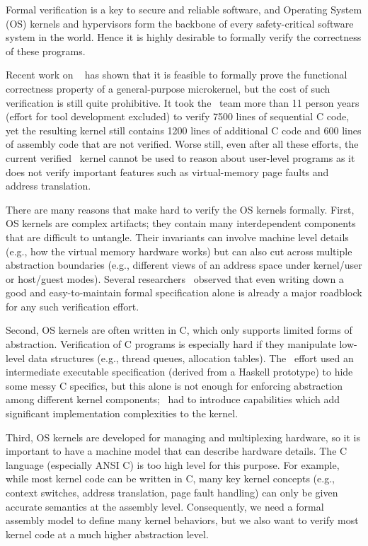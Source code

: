 
Formal verification is a key to secure and reliable software, and  Operating System (OS) kernels and hypervisors form the backbone of every safety-critical software system in the world. 
Hence it is highly desirable to formally verify the correctness of these programs.

Recent work on \selfour~\cite{klein2009sel4,klein14} has shown that it is feasible to formally prove the functional correctness property of a general-purpose microkernel, but the cost of such verification is still quite prohibitive. 
It took the \selfour\ team more than 11 person years (effort for tool development excluded) to verify 7500 lines of sequential C code, yet the resulting kernel still contains 1200 lines of additional C code and 600 lines of assembly code that are not verified. 
Worse still, even after all these efforts, the current verified \selfour\ kernel cannot be used to reason about user-level programs as it does not verify important features such as virtual-memory page faults and address translation.

There are many reasons that make hard to verify the OS kernels formally.
First, OS kernels are complex artifacts; they contain many interdependent components that are difficult to untangle.
Their invariants can involve machine level details (e.g., how the virtual memory hardware works) but can also cut across multiple abstraction boundaries (e.g., different views of an address space under kernel/user or host/guest modes).
Several researchers~\cite{baumann12,vaynberg12} observed that even writing down a good and easy-to-maintain formal specification alone is already a major roadblock for any such verification effort.

Second, OS kernels are often written in C, which only supports limited forms of abstraction.  Verification of C programs is especially hard if they manipulate low-level data structures (e.g., thread queues, allocation tables).  
The \selfour\ effort used an intermediate executable specification (derived from a Haskell prototype) to hide some messy C specifics, but this alone is not enough for enforcing abstraction among different kernel components; \selfour\ had to introduce capabilities which add significant implementation complexities to the kernel.

Third, OS kernels are developed for managing and multiplexing hardware, so it is important to have a machine model that can describe hardware details.
The C language (especially ANSI C) is too high level for this purpose. For example, while most kernel code can be written in C, many key kernel concepts (e.g., context switches, address translation, page fault handling) can only be given accurate semantics at the assembly level. Consequently, we need a formal assembly model to define many kernel behaviors, but we also want to verify most kernel code at a much higher abstraction level.

